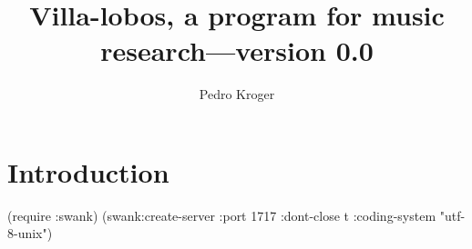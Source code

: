 \documentclass[11pt]{article}
\title{Villa-lobos, a program for music research---version 0.0}
\author{Pedro Kroger}
\begin{document}
\maketitle
\tableofcontents
\newpage

\section{Introduction}
\label{sec:introduction}

(require :swank)
(swank:create-server :port 1717 :dont-close t :coding-system "utf-8-unix")
\end{document}
